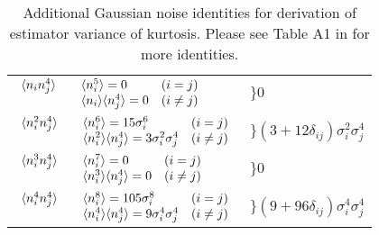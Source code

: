 \documentclass[fleqn,usenatbib]{mnras}
\begin{document}
\begin{table}
\caption{Additional Gaussian noise identities for derivation of estimator variance of kurtosis. Please see Table A1 in \citet{Watkinson:2014jv} for more identities.}
\label{tab:noise}
\begin{tabular}{l l}
    \hline
    $\begin{array}{l l l l}
        \langle n_i n_j^4 \rangle 
            && \langle n_i^5 \rangle=0 & (i=j) \\
            && \langle n_i \rangle\langle n_j^4 \rangle=0 & (i \neq j)
    \end{array}$ & $\bigg\rbrace0$ \\
    $\begin{array}{l l l l}
        \langle n_i^2 n_j^4 \rangle 
            && \langle n_i^6 \rangle=15\sigma_i^6 & (i=j) \\
            && \langle n_i^2 \rangle\langle n_j^4 \rangle=3\sigma_i^2\sigma_j^4 & (i \neq j)
    \end{array}$ & $\bigg\rbrace(3+12\delta_{ij})\sigma_i^2\sigma_j^4$ \\
    $\begin{array}{l l l l}
        \langle n_i^3 n_j^4 \rangle 
            && \langle n_i^7 \rangle=0 & (i=j) \\
            && \langle n_i^3 \rangle\langle n_j^4 \rangle=0 & (i \neq j)
    \end{array}$ & $\bigg\rbrace0$ \\
    $\begin{array}{l l l l}
        \langle n_i^4 n_j^4 \rangle 
            && \langle n_i^8 \rangle=105\sigma_i^8 & (i=j) \\
            && \langle n_i^4 \rangle\langle n_j^4 \rangle=9\sigma_i^4\sigma_j^4 & (i \neq j)
    \end{array}$ & $\bigg\rbrace(9+96\delta_{ij})\sigma_i^4\sigma_j^4$ \\
    \hline
\end{tabular}
\end{table}




\bsp	%
\label{lastpage}
\end{document}
